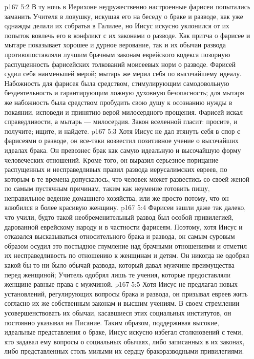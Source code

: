 \vs p167 5:2 \pc В ту ночь в Иерихоне недружественно настроенные фарисеи попытались заманить Учителя в ловушку, искушая его на беседу о браке и разводе, как уже однажды делали их собратья в Галилее, но Иисус искусно уклонился от их попыток вовлечь его в конфликт с их законами о разводе. Как притча о фарисее и мытаре показывает хорошее и дурное верование, так и их обычаи развода противопоставляли лучшим брачным законам еврейского кодекса позорную распущенность фарисейских толкований моисеевых норм о разводе. Фарисей судил себя наименьшей мерой; мытарь же мерил себя по высочайшему идеалу. Набожность для фарисея была средством, стимулирующим самодовольную бездеятельность и гарантирующим ложную духовную безопасность; для мытаря же набожность была средством пробудить свою душу к осознанию нужды в покаянии, исповеди и принятию верой милосердного прощения. Фарисей искал справедливости, а мытарь --- милосердия. Закон вселенной гласит: просите, и получите; ищите, и найдете.
\vs p167 5:3 Хотя Иисус не дал втянуть себя в спор с фарисеями о разводе, он все\hyp{}таки возвестил позитивное учение о высочайших идеалах брака. Он превознес брак как самую идеальную и высочайшую форму человеческих отношений. Кроме того, он выразил серьезное порицание распущенных и несправедливых правил развода иерусалимских евреев, по которым в те времена допускалось, что человек может развестись со своей женой по самым пустячным причинам, таким как неумение готовить пищу, неправильное ведение домашнего хозяйства, или же просто потому, что он влюбился в более красивую женщину.
\vs p167 5:4 Фарисеи зашли даже так далеко, что учили, будто такой необременительный развод был особой привилегией, дарованной еврейскому народу и в частности фарисеям. Поэтому, хотя Иисус и отказался высказываться относительного брака и развода, он самым суровым образом осудил это постыдное глумление над брачными отношениями и отметил их несправедливость по отношению к женщинам и детям. Он никогда не одобрял какой бы то ни было обычай развода, который давал мужчине преимущества перед женщиной; Учитель одобрял лишь те учения, которые предоставляли женщине равные права с мужчиной.
\vs p167 5:5 Хотя Иисус не предлагал новых установлений, регулирующих вопросы брака и развода, он призывал евреев жить согласно их же собственным законам и высшим учениям. В своем стремлении усовершенствовать их обычаи, касавшиеся этих социальных институтов, он постоянно указывал на Писание. Таким образом, поддерживая высокие, идеальные представления о браке, Иисус искусно избегал столкновений с теми, кто задавал ему вопросы о социальных обычаях, либо записанных в их законах, либо представленных столь милыми их сердцу бракоразводными привилегиями.
